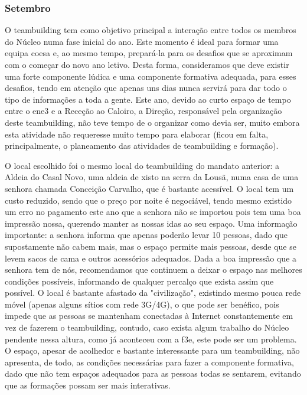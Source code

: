 \subsubsection{Setembro}

O teambuilding tem como objetivo principal a interação entre todos os membros do Núcleo numa fase inicial do ano. Este momento é ideal para formar uma equipa coesa e, ao mesmo tempo, prepará-la para os desafios que se aproximam com o começar do novo ano letivo. Desta forma, consideramos que deve existir uma forte componente lúdica e uma componente formativa adequada, para esses desafios, tendo em atenção que apenas uns dias nunca servirá para dar todo o tipo de informações a toda a gente. Este ano, devido ao curto espaço de tempo entre o \acrshort{ene3} e a Receção ao Caloiro, a Direção, responsável pela organização deste teambuilding, não teve tempo de o organizar como devia ser, muito embora esta atividade não requeresse muito tempo para elaborar (ficou em falta, principalmente, o planeamento das atividades de teambuilding e formação).

O local escolhido foi o mesmo local do teambuilding do mandato anterior: a Aldeia do Casal Novo, uma aldeia de xisto na serra da Lousã, numa casa de uma senhora chamada Conceição Carvalho, que é bastante acessível. O local tem um custo reduzido, sendo que o preço por noite é negociável, tendo mesmo existido um erro no pagamento este ano que a senhora não se importou pois tem uma boa impressão nossa, querendo manter as nossas idas ao seu espaço. Uma informação importante: a senhora informa que apenas poderão levar 10 pessoas, dado que supostamente não cabem mais, mas o espaço permite mais pessoas, desde que se levem sacos de cama e outros acessórios adequados. Dada a boa impressão que a senhora tem de nós, recomendamos que continuem a deixar o espaço nas melhores condições possíveis, informando de qualquer percalço que exista assim que possível. O local é bastante afastado da "civilização", existindo mesmo pouca rede móvel (apenas alguns sítios com rede 3G/4G), o que pode ser benéfico, pois impede que as pessoas se mantenham conectadas à Internet constantemente em vez de fazerem o teambuilding, contudo, caso exista algum trabalho do Núcleo pendente nessa altura, como já aconteceu com a \acrshort{f3e}, este pode ser um problema. O espaço, apesar de acolhedor e bastante interessante para um teambuilding, não apresenta, de todo, as condições necessárias para fazer a componente formativa, dado que não tem espaços adequados para as pessoas todas se sentarem, evitando que as formações possam ser mais interativas.

